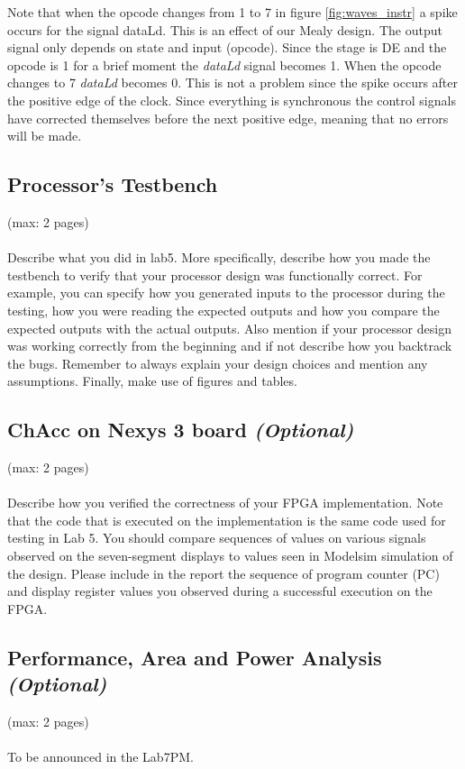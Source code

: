 \documentclass[a4paper,11pt]{article}
\begin{document}
Note that when the opcode changes from 1 to 7 in figure \ref{fig:waves_instr} a spike occurs for the signal dataLd. This is an effect of our Mealy design. The output signal only depends on state and input (opcode). Since the stage is DE and the opcode is 1 for a brief moment the \textit{dataLd} signal becomes 1. When the opcode changes to 7 \textit{dataLd} becomes 0. This is not a problem since the spike occurs after the positive edge of the clock. Since everything is synchronous the control signals have corrected themselves before the next positive edge, meaning that no errors will be made. 

\subsection{Processor's Testbench}
(max: 2 pages)
\\\\
Describe what you did in lab5. More specifically, describe how you made the testbench to verify that your processor design was functionally correct. For example, you can specify how you generated inputs to the processor during the testing, how you were reading the expected outputs and how you compare the expected outputs with the actual outputs. Also mention if your processor design was working correctly from the beginning and if not describe how you backtrack the bugs. Remember to always explain your design choices and mention any assumptions. Finally, make use of figures and tables. 

\subsection{ChAcc on Nexys 3 board \emph{(Optional)}}
(max: 2 pages)
\\\\
Describe how you verified the correctness of your FPGA implementation. Note that the code that is executed on the implementation is the same code used for testing in Lab 5. You should compare sequences of values on various signals observed on the seven-segment displays to values seen in Modelsim simulation of the design. Please include in the report the sequence of program counter (PC) and display register values you observed during a successful execution on the FPGA. 

\subsection{Performance, Area and Power Analysis \emph{(Optional)}}
(max: 2 pages)
\\\\
To be announced in the Lab7PM.
\end{document}
